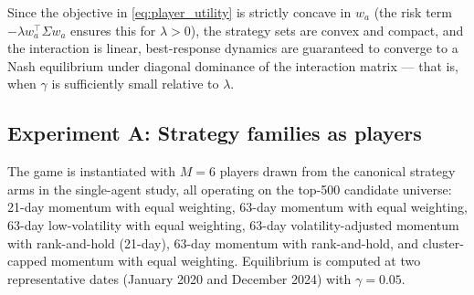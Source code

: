 \documentclass[journal,10pt]{IEEEtran}
\begin{document}
Since the objective in \eqref{eq:player_utility} is strictly concave in $w_a$ (the risk term $-\lambda w_a^\top\Sigma w_a$ ensures this for $\lambda>0$), the strategy sets are convex and compact, and the interaction is linear, best-response dynamics are guaranteed to converge to a Nash equilibrium under diagonal dominance of the interaction matrix — that is, when $\gamma$ is sufficiently small relative to $\lambda$.

\subsection{Experiment A: Strategy families as players}
The game is instantiated with $M=6$ players drawn from the canonical strategy arms in the single-agent study, all operating on the top-500 candidate universe: 21-day momentum with equal weighting, 63-day momentum with equal weighting, 63-day low-volatility with equal weighting, 63-day volatility-adjusted momentum with rank-and-hold (21-day), 63-day momentum with rank-and-hold, and cluster-capped momentum with equal weighting. Equilibrium is computed at two representative dates (January 2020 and December 2024) with $\gamma=0.05$.

\begin{table}[!t]
\centering
\caption{Single-agent versus equilibrium utilities at the recent evaluation date ($\gamma=0.05$, $\lambda=1.0$, $\kappa=0.001$). Single-agent utility is computed with $\gamma=0$ (no crowding). Equilibrium utility includes the crowding penalty. Negative efficiency loss indicates improvement in equilibrium.}
\label{tab:equilibrium_utilities}
\footnotesize
{}
\end{table}
\end{document}
